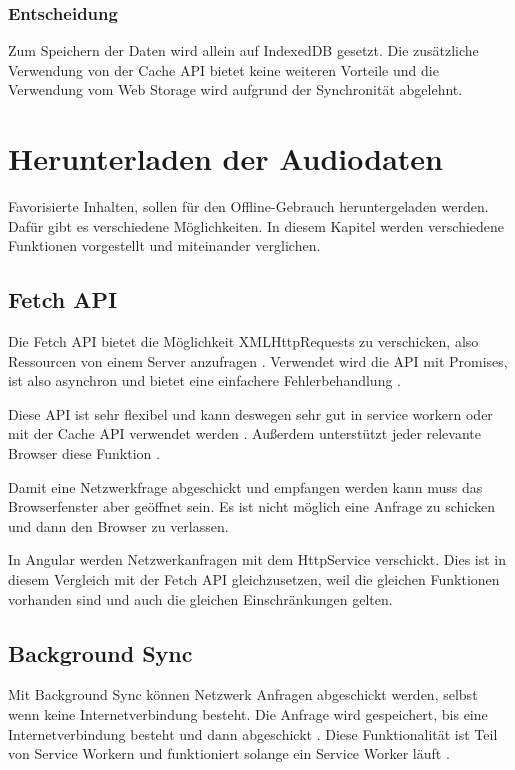 \subsubsection{Entscheidung}
Zum Speichern der Daten wird allein auf IndexedDB gesetzt. Die zusätzliche Verwendung von der Cache \ac{API} bietet keine weiteren Vorteile und die Verwendung vom Web Storage wird aufgrund der Synchronität abgelehnt.  

\clearpage

\section{Herunterladen der Audiodaten}
Favorisierte Inhalten, sollen für den Offline-Gebrauch heruntergeladen werden. Dafür gibt es verschiedene Möglichkeiten. In diesem Kapitel werden verschiedene Funktionen vorgestellt und miteinander verglichen. 

\subsection{Fetch API}
Die Fetch \ac{API} bietet die Möglichkeit XMLHttpRequests zu verschicken, also Ressourcen von einem Server anzufragen \autocite{Rojas2020}. Verwendet wird die \ac{API} mit Promises, ist also asynchron und bietet eine einfachere Fehlerbehandlung \autocite{Rojas2020} \autocite{mdn-fetch}. 

Diese \ac{API} ist sehr flexibel und kann deswegen sehr gut in service workern oder mit der Cache \ac{API} verwendet werden \autocite{mdn-fetch}. Außerdem unterstützt jeder relevante Browser diese Funktion \autocite{mdn-fetch}. 

Damit eine Netzwerkfrage abgeschickt und empfangen werden kann muss das Browserfenster aber geöffnet sein. Es ist nicht möglich eine Anfrage zu schicken und dann den Browser zu verlassen.

In Angular werden Netzwerkanfragen mit dem HttpService verschickt. Dies ist in diesem Vergleich mit der Fetch \ac{API} gleichzusetzen, weil die gleichen Funktionen vorhanden sind und auch die gleichen Einschränkungen gelten.

\subsection{Background Sync}
Mit Background Sync können Netzwerk Anfragen abgeschickt werden, selbst wenn keine Internetverbindung besteht. Die Anfrage wird gespeichert, bis eine Internetverbindung besteht und dann abgeschickt \autocite{wicg-background-sync}. Diese Funktionalität ist Teil von Service Workern und funktioniert solange ein Service Worker läuft \autocite{wicg-background-sync}. 


